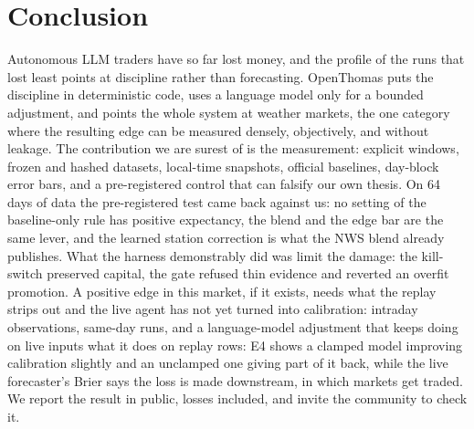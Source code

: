 \documentclass[sigconf,review,anonymous]{acmart}
\begin{document}
\section{Conclusion}

Autonomous LLM traders have so far lost money, and the profile of the runs that
lost least points at discipline rather than forecasting. OpenThomas puts the
discipline in deterministic code, uses a language model only for a bounded
adjustment, and points the whole system at weather markets, the one category
where the resulting edge can be measured densely, objectively, and without
leakage. The contribution we are surest of is the measurement: explicit
windows, frozen and hashed datasets, local-time snapshots, official baselines,
day-block error bars, and a pre-registered control that can falsify our own
thesis. On 64 days of data the pre-registered test came back against us: no
setting of the baseline-only rule has positive expectancy, the blend and the
edge bar are the same lever, and the learned station correction is what the
NWS blend already publishes. What the harness demonstrably did was limit the
damage: the kill-switch preserved capital, the gate refused thin evidence and
reverted an overfit promotion. A positive edge in this market, if it exists,
needs what the replay strips out and the live agent has not yet turned into
calibration: intraday observations, same-day runs, and a language-model
adjustment that keeps doing on live inputs what it does on replay rows: E4
shows a clamped model improving calibration slightly and an unclamped one
giving part of it back, while the live forecaster's Brier says the loss is
made downstream, in which markets get traded. We report the result in public,
losses included, and invite the community to check it.
\end{document}
